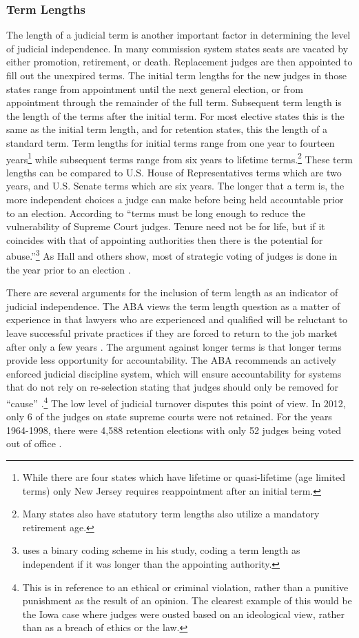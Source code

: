 \documentclass[12pt]{article}
\begin{document}
\subsubsection*{Term Lengths}
The length of a judicial term is another important factor in determining the level of judicial independence.  In many commission system states seats are vacated by either promotion, retirement, or death. Replacement judges are then appointed to fill out the unexpired terms. The initial term lengths for the new judges in those states range from appointment until the next general election, or from appointment through the remainder of the full term. Subsequent term length is the length of the terms after the initial term. For most elective states this is the same as the initial term length, and for retention states, this the length of a standard term. Term lengths for initial terms range from one year to fourteen years\footnote{While there are four states which have lifetime or quasi-lifetime (age limited terms) only New Jersey requires reappointment after an initial term.} while subsequent terms range from six years to lifetime terms.\footnote{Many states also have statutory term lengths also utilize a mandatory retirement age.}  These term lengths can be compared to U.S. House of Representatives terms which are two years, and U.S. Senate terms which are six years.  The longer that a term is, the more independent choices a judge can make before being held accountable prior to an election.  According to \citet[31]{Rios2006} ``terms must be long enough to reduce the vulnerability of Supreme Court judges.  Tenure need not be for life, but if it coincides with that of appointing authorities then there is the potential for abuse.''\footnote{\citet{Rios2006} uses a binary coding scheme in his study, coding a term length as independent if it was longer than the appointing authority.}  As Hall and others show, most of strategic voting of judges is done in the year prior to an election \citep{Hall1987,Hall1985,Brace2008,Canes-Wrone2012}.  

There are several arguments for the inclusion of term length as an indicator of judicial independence. The ABA views the term length question as a matter of experience in that lawyers who are experienced and qualified will be reluctant to leave successful private practices if they are forced to return to the job market after only a few years \citep[97]{ABA2003}.   The argument against longer terms is that longer terms provide less opportunity for accountability. The ABA recommends an actively enforced judicial discipline system, which will ensure accountability for systems that do not rely on re-selection stating that judges should only be removed for ``cause'' \citep[103]{ABA2003}.\footnote{This is in reference to an ethical or criminal violation, rather than a punitive punishment as the result of an opinion.  The clearest example of this would be the Iowa case where judges were ousted based on an ideological view, rather than as a breach of ethics or the law.}  The low level of judicial turnover disputes this point of view. In 2012, only 6 of the judges on state supreme courts were not retained. For the years 1964-1998, there were 4,588 retention elections with only 52 judges being voted out of office \citep{Aspin2000}.  
\end{document}
